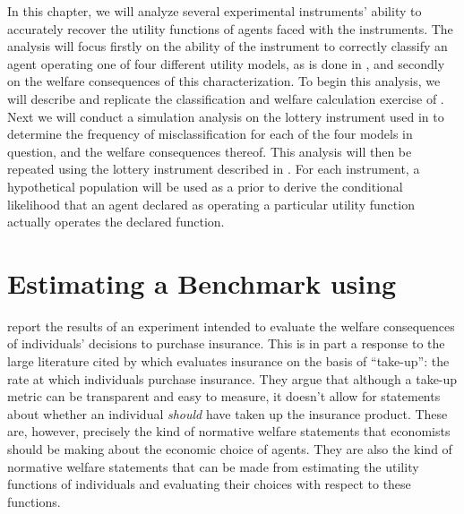 \documentclass[../main.tex]{subfiles}
\begin{document}
In this chapter, we will analyze several experimental instruments' ability to accurately recover the utility functions of agents faced with the instruments.
The analysis will focus firstly on the ability of the instrument to correctly classify an agent operating one of four different utility models, as is done in \textcite{Harrison2016}, and secondly on the welfare consequences of this characterization.
To begin this analysis, we will describe and replicate the classification and welfare calculation exercise of \textcite{Harrison2016}.
Next we will conduct a simulation analysis on the lottery instrument used in \textcite{Harrison2016} to determine the frequency of misclassification for each of the four models in question, and the welfare consequences thereof.
This analysis will then be repeated using the lottery instrument described in \textcite{Hey1994}.
For each instrument, a hypothetical population will be used as a prior to derive the conditional likelihood that an agent declared as operating a particular utility function actually operates the declared function.

\section{Estimating a Benchmark using \texorpdfstring{\textcite{Harrison2016}}{Harrison and Ng (2015)}}

\textcite{Harrison2016} report the results of an experiment intended to evaluate the welfare consequences of individuals' decisions to purchase insurance.
This is in part a response to the large literature cited by \textcite[1]{Harrison2016} which evaluates insurance on the basis of \enquote{take-up}: the rate at which individuals purchase insurance.
They argue that although a take-up metric can be transparent and easy to measure, it doesn't allow for statements about whether an individual \textit{should} have taken up the insurance product.
These are, however, precisely the kind of normative welfare statements that economists should be making about the economic choice of agents.
They are also the kind of normative welfare statements that can be made from estimating the utility functions of individuals and evaluating their choices with respect to these functions.
\end{document}
